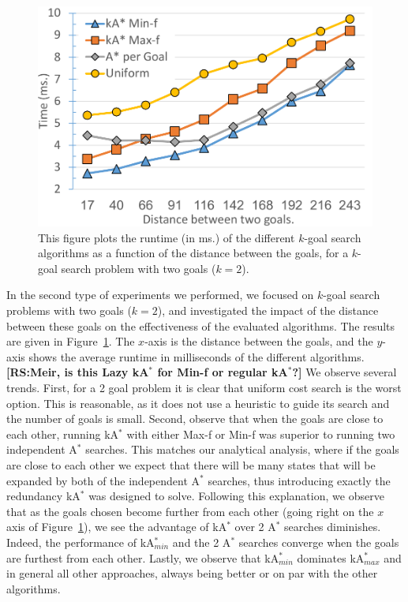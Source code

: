 \documentclass{aicom2e}
\newcommand{\kgs}{$k$-goal search}
\newcommand{\astar}{A$^*$}
\newcommand{\kastar}{kA$^*$}
\newcommand{\kastarmin}{kA$^*_{min}$}
\newcommand{\kastarmax}{kA$^*_{max}$}
\newcommand{\minf}{Min-f}
\newcommand{\maxf}{Max-f}
\newcommand{\roni}[1]{\textbf{[RS:#1]}}
\begin{document}
\begin{figure}
	\includegraphics[width=\columnwidth]{G0-G1_cropped.pdf}      
	\caption{This figure plots the runtime (in ms.) of the different \kgs{} algorithms as a function of the distance between the goals, for a \kgs{} problem with two goals ($k=2$).}
	\label{fig:2-goal}
\end{figure}
In the second type of experiments we performed, we focused on \kgs{} problems with two goals ($k=2$), and investigated the impact of the distance between these goals on the effectiveness of the evaluated algorithms. 
The results are given in Figure~\ref{fig:2-goal}. The $x$-axis is the distance between the goals, and the $y$-axis shows the average runtime in milliseconds of the different algorithms. \roni{Meir, is this Lazy \kastar{} for \minf{} or regular \kastar{}?} 
We observe several trends. 
First, for a 2 goal problem it is clear that uniform cost search is the worst option. 
This is reasonable, as it does not use a heuristic to guide its search and the number of goals is small. 
Second, observe that when the goals are close to each other, running \kastar{} with either \maxf{} or \minf{} was superior to running two independent \astar{} searches. This matches our analytical analysis, where if the goals are close to each other we expect that there will be many states that will be expanded by both of the independent \astar{} searches, thus introducing exactly the redundancy \kastar{} was designed to solve. 
Following this explanation, we observe that as the goals chosen become further from each other (going right on the $x$ axis of Figure~\ref{fig:2-goal}), we see the advantage of \kastar{} over 2 \astar{} searches diminishes. Indeed, the performance of \kastarmin{}  and the 2 \astar{} searches converge when the goals are furthest from each other. 
Lastly, we observe that \kastarmin{} dominates \kastarmax{} and in general all other approaches, always being better or on par with the other algorithms. 
\end{document}

